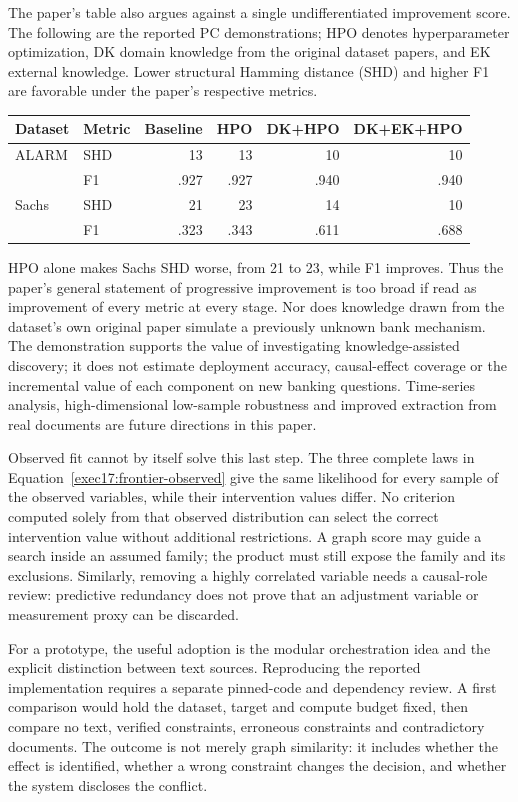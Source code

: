 The paper's table also argues against a single undifferentiated improvement
score. The following are the reported PC demonstrations; HPO denotes
hyperparameter optimization, DK domain knowledge from the original dataset
papers, and EK external knowledge. Lower structural Hamming distance (SHD)
and higher F1 are favorable under the paper's respective metrics.
\citep{exec17_frontier_yang}

\begin{center}
\begin{tabular}{llrrrr}
\toprule
Dataset & Metric & Baseline & HPO & DK+HPO & DK+EK+HPO\\
\midrule
ALARM & SHD &13&13&10&10\\
      & F1  &.927&.927&.940&.940\\
Sachs & SHD &21&23&14&10\\
      & F1  &.323&.343&.611&.688\\
\bottomrule
\end{tabular}
\end{center}

HPO alone makes Sachs SHD worse, from 21 to 23, while F1 improves. Thus
the paper's general statement of progressive improvement is too broad if
read as improvement of every metric at every stage. Nor does knowledge
drawn from the dataset's own original paper simulate a previously unknown
bank mechanism. The demonstration supports the value of investigating
knowledge-assisted discovery; it does not estimate deployment accuracy,
causal-effect coverage or the incremental value of each component on new
banking questions. Time-series analysis, high-dimensional low-sample
robustness and improved extraction from real documents are future directions
in this paper.\citep{exec17_frontier_yang}

Observed fit cannot by itself solve this last step. The three complete laws
in Equation~\ref{exec17:frontier-observed} give the same likelihood for every
sample of the observed variables, while their intervention values differ.
No criterion computed solely from that observed distribution can select the
correct intervention value without additional restrictions. A graph score
may guide a search inside an assumed family; the product must still expose
the family and its exclusions. Similarly, removing a highly correlated
variable needs a causal-role review: predictive redundancy does not prove
that an adjustment variable or measurement proxy can be discarded.
\citep{exec17_frontier_exact}

For a prototype, the useful adoption is the modular orchestration idea and
the explicit distinction between text sources. Reproducing the reported
implementation requires a separate pinned-code and dependency review.
A first comparison would hold the dataset, target and compute budget fixed,
then compare no text, verified constraints, erroneous constraints and
contradictory documents. The outcome is not merely graph similarity: it
includes whether the effect is identified, whether a wrong constraint
changes the decision, and whether the system discloses the conflict.

